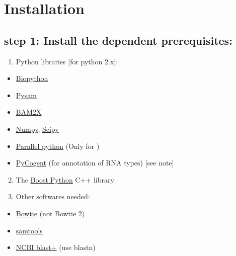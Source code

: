 \documentclass[letterpaper,10pt,english]{sphinxmanual}
\begin{document}
\section{Installation}
\label{Stitch-seq-tools:installation}

\subsection{step 1: Install the dependent prerequisites:}
\label{Stitch-seq-tools:step-1-install-the-dependent-prerequisites}\begin{enumerate}
\item {} 
Python libraries {[}for python 2.x{]}:

\end{enumerate}
\begin{itemize}
\item {} 
\href{http://biopython.org/wiki/Main\_Page}{Biopython}

\item {} 
\href{https://code.google.com/p/pysam/}{Pysam}

\item {} 
\href{http://bam2xwiki.appspot.com/Welcome}{BAM2X}

\item {} 
\href{http://www.numpy.org/}{Numpy}, \href{http://www.scipy.org/scipylib/index.html}{Scipy}

\item {} 
\href{http://www.parallelpython.com/}{Parallel python} (Only for )

\item {} 
\href{http://pycogent.org/}{PyCogent} (for annotation of RNA types) {[}see note{]}

\end{itemize}
\begin{enumerate}
\setcounter{enumi}{1}
\item {} 
The \href{http://www.boost.org/doc/libs/1\_54\_0/libs/python/doc/index.html}{Boost.Python} C++ library

\item {} 
Other softwares needed:

\end{enumerate}
\begin{itemize}
\item {} 
\href{http://bowtie-bio.sourceforge.net/index.shtml}{Bowtie} (not Bowtie 2)

\item {} 
\href{http://samtools.sourceforge.net/}{samtools}

\item {} 
\href{ftp://ftp.ncbi.nlm.nih.gov/blast/executables/blast+/LATEST/}{NCBI blast+} (use blastn)

\end{itemize}
\end{document}
